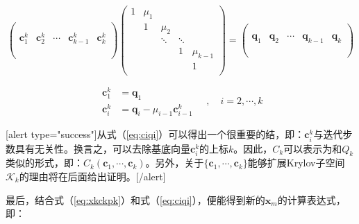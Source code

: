 \documentclass[UTF8,nofonts]{ctexart}
\begin{document}
\begin{equation*}
	\begin{pmatrix}
		~ & ~ & ~ & ~ & ~ \\
		~ & ~ & ~ & ~ & ~ \\
		\boldsymbol{c}_1^k & \boldsymbol{c}_2^k & \cdots &
		\boldsymbol{c}_{k-1}^k & \boldsymbol{c}_k^k \\
		~ & ~ & ~ & ~ & ~ \\
		~ & ~ & ~ & ~ & ~ \\
	\end{pmatrix}
	\begin{pmatrix}
		1 & \mu_1  & & & \\
		& 1 & \mu_2 & & \\
		& & \ddots & \ddots & \\
		& & & 1 & \mu_{k-1} \\
		& & & & 1 \\
	\end{pmatrix}=
	\begin{pmatrix}
		~ & ~ & ~ & ~ & ~ \\
		~ & ~ & ~ & ~ & ~ \\
		\boldsymbol{q}_1 & \boldsymbol{q}_2 & \cdots &
		\boldsymbol{q}_{k-1} & \boldsymbol{q}_k \\
		~ & ~ & ~ & ~ & ~ \\
		~ & ~ & ~ & ~ & ~ \\
	\end{pmatrix}
\end{equation*}

\begin{equation}
	\label{eq:ciqi}
	\begin{aligned}
		\boldsymbol{c}_1^k &= \boldsymbol{q}_1 \\
		\boldsymbol{c}_i^k &= \boldsymbol{q}_i-\mu_{i-1}\boldsymbol{c}^k_{i-1}
	\end{aligned} \quad,\quad
	i=2,\cdots,k
\end{equation}

[alert type="success"]从式（\ref{eq:ciqi}）可以得出一个很重要的结，即：$\boldsymbol{c}^k_i$与迭代步数具有无关性。换言之，可以去除基底向量$\boldsymbol{c}_i^k$的上标$k$。因此，$C_k$可以表示为和$Q_k$类似的形式，即：$C_k(\boldsymbol{c}_1,\cdots,\boldsymbol{c}_k)$。另外，关于$\{\boldsymbol{c}_1,\cdots,\boldsymbol{c}_k\}$能够扩展Krylov子空间$\mathcal{K}_k$的理由将在后面给出证明。[/alert]

最后，结合式（\ref{eq:xkckpk}）和式（\ref{eq:ciqi}），便能得到新的$\boldsymbol{x}_m$的计算表达式，即：
\end{document}
